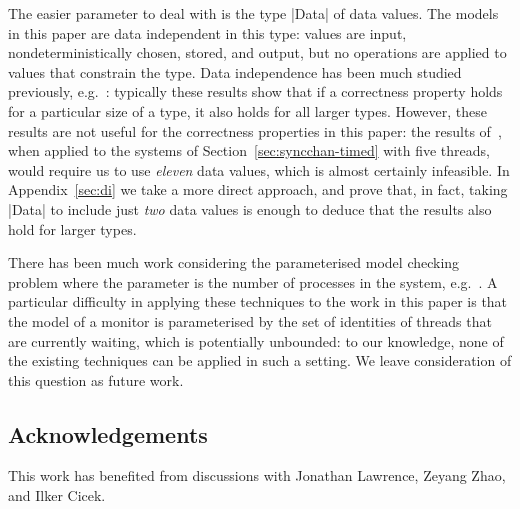 The easier parameter to deal with is the type |Data| of data values.  The
models in this paper are data independent in this type: values are input,
nondeterministically chosen, stored, and output, but no operations are applied
to values that constrain the type.  Data independence has been much studied
previously, e.g.~\cite{Wolper-1986, ranko-thesis}: typically these results
show that if a correctness property holds for a particular size of a type, it
also holds for all larger types.  However, these results are not useful for
the correctness properties in this paper: the results
of~\cite[Section~15.2]{awr:TPC}, when applied to the systems of
Section~\ref{sec:syncchan-timed} with five threads, would require us to use
\emph{eleven} data values, which is almost certainly infeasible.  In
Appendix~\ref{sec:di} we take a more direct approach, and prove that, in fact,
taking |Data| to include just \emph{two} data values is enough to deduce that
the results also hold for larger types.

There has been much work considering the parameterised model checking problem
where the parameter is the number of processes in the system,
e.g.~\cite{Lubachevsky:1984, Clarke:1987, wolper-lovinfosse89,
  sistla-german92, EN1995, Pnueli:2002, tomasz-gavin-CA, AHH16, gavin:VA22}.
A particular difficulty in applying these techniques to the work in this paper
is that the model of a monitor is parameterised by the set of identities of
threads that are currently waiting, which is potentially unbounded: to our
knowledge, none of the existing techniques can be applied in such a setting.
We leave consideration of this question as future work. 

\subsection*{Acknowledgements}

This work has benefited from discussions with Jonathan Lawrence, Zeyang Zhao,
and Ilker Cicek.




